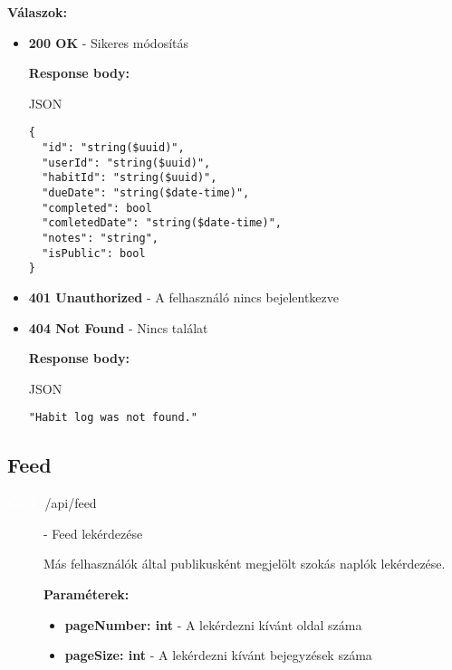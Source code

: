 \documentclass[12pt]{report}
\newcommand{\httpGet}[1]{\colorbox{getColor}{\textbf{\textcolor{white}{GET}}}~#1}
\begin{document}
\begin{itemize}
\begin{description}
    \vspace{0.5cm}
    \textbf{Válaszok:}
    \begin{itemize}
      \item \textbf{200 OK} - Sikeres módosítás

        \textbf{Response body:}
        \begin{codeblock}{JSON}
          \begin{verbatim}
{
  "id": "string($uuid)",
  "userId": "string($uuid)",
  "habitId": "string($uuid)",
  "dueDate": "string($date-time)",
  "completed": bool
  "comletedDate": "string($date-time)",
  "notes": "string",
  "isPublic": bool
}
          \end{verbatim}
        \end{codeblock}

      \item \textbf{401 Unauthorized} - A felhasználó nincs bejelentkezve

      \item \textbf{404 Not Found} - Nincs találat

        \textbf{Response body:}
        \begin{codeblock}{JSON}
          \begin{verbatim} 
"Habit log was not found."
          \end{verbatim}
        \end{codeblock}
    \end{itemize}
\end{description}

\subsection{Feed}
\begin{description}
  \item[\httpGet{/api/feed}] - Feed lekérdezése
  
    \vspace{0.5cm}
    Más felhasználók által publikusként megjelölt szokás naplók lekérdezése.

    \vspace{0.5cm}
    \textbf{Paraméterek:}
    \begin{itemize}
      \item \textbf{pageNumber: int} - A lekérdezni kívánt oldal száma
      \item \textbf{pageSize: int} - A lekérdezni kívánt bejegyzések száma
    \end{itemize}


\end{description}
\end{itemize}
\end{document}

